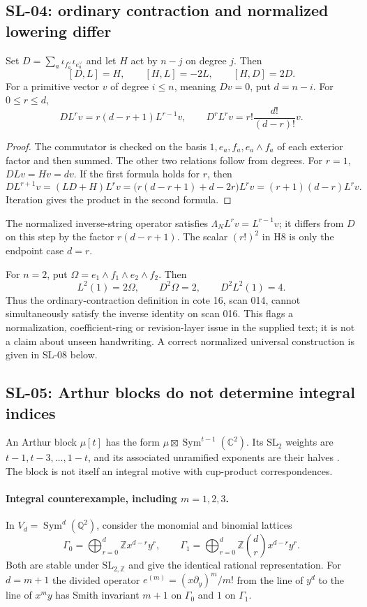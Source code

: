 \subsection{SL-04: ordinary contraction and normalized lowering differ}
\label{sl:contraction}

Set $D=\sum_a\iota_{f_a^\vee}\iota_{e_a^\vee}$ and let $H$ act by
$n-j$ on degree $j$.  Then
\[
 [D,L]=H,\qquad[H,L]=-2L,\qquad[H,D]=2D.
\]
For a primitive vector $v$ of degree $i\le n$, meaning $Dv=0$, put
$d=n-i$.  For $0\le r\le d$,
\[
 DL^rv=r(d-r+1)L^{r-1}v,\qquad
 D^rL^rv=r!\frac{d!}{(d-r)!}v.
\]
\begin{proof}
The commutator is checked on the basis $1,e_a,f_a,e_a\wedge f_a$ of
each exterior factor and then summed.  The other two relations follow from
degrees.  For $r=1$, $DLv=Hv=dv$.  If the first formula holds for $r$, then
\[
 DL^{r+1}v=(LD+H)L^rv
 =\bigl(r(d-r+1)+d-2r\bigr)L^rv
 =(r+1)(d-r)L^rv.
\]
Iteration gives the product in the second formula.
\end{proof}
The normalized inverse-string operator satisfies
$\Lambda_N L^rv=L^{r-1}v$; it differs from $D$ on this step by the
factor $r(d-r+1)$.  The scalar $(r!)^2$ in H8 is only the endpoint case
$d=r$.

For $n=2$, put $\Omega=e_1\wedge f_1\wedge e_2\wedge f_2$.  Then
\[
 L^2(1)=2\Omega,\qquad D^2\Omega=2,\qquad D^2L^2(1)=4.
\]
Thus the ordinary-contraction definition in cote 16, scan 014, cannot
simultaneously satisfy the inverse identity on scan 016.  This flags a
normalization, coefficient-ring or revision-layer issue in the supplied
text; it is not a claim about unseen handwriting.  A correct normalized
universal construction is given in SL-08 below.

\subsection{SL-05: Arthur blocks do not determine integral indices}
\label{sl:arthur-lattice}

An Arthur block $\mu[t]$ has the form
$\mu\boxtimes\operatorname{Sym}^{t-1}(\mathbb C^2)$.  Its $\mathrm{SL}_2$
weights are $t-1,t-3,\ldots,1-t$, and its associated unramified exponents
are their halves \cite[\S2.3, equation (2.3.1)]{Mok}.  The block is not
itself an integral motive with cup-product correspondences.

\paragraph{Integral counterexample, including $m=1,2,3$.}
In $V_d=\operatorname{Sym}^d(\mathbb Q^2)$, consider the monomial and
binomial lattices
\[
 \Gamma_0=\bigoplus_{r=0}^d\mathbb Zx^{d-r}y^r,\qquad
 \Gamma_1=\bigoplus_{r=0}^d
             \mathbb Z\binom drx^{d-r}y^r.
\]
Both are stable under $\mathrm{SL}_{2,\mathbb Z}$ and give the identical
rational representation.  For $d=m+1$ the divided operator
$e^{(m)}=(x\partial_y)^m/m!$ from the line of $y^d$ to the line of
$x^my$ has Smith invariant $m+1$ on $\Gamma_0$ and $1$ on $\Gamma_1$.

